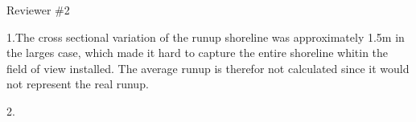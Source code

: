 Reviewer \#2

1.The cross sectional variation of the runup shoreline was approximately 1.5m in the larges case, which made it hard to capture the entire shoreline whitin the field of view installed. The average runup is therefor not calculated since it would not represent the real runup.  



2.
